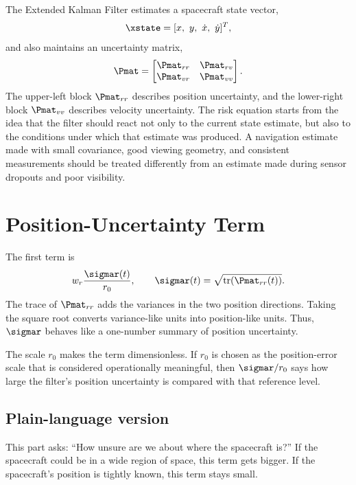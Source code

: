 \documentclass[11pt]{article}
\begin{document}
The Extended Kalman Filter estimates a spacecraft state vector,
\begin{equation}
  \xstate = [x,\ y,\ \dot{x},\ \dot{y}]^T,
\end{equation}
and also maintains an uncertainty matrix,
\begin{equation}
  \Pmat =
  \begin{bmatrix}
    \Pmat_{rr} & \Pmat_{rv}\\
    \Pmat_{vr} & \Pmat_{vv}
  \end{bmatrix}.
\end{equation}
The upper-left block $\Pmat_{rr}$ describes position uncertainty, and the
lower-right block $\Pmat_{vv}$ describes velocity uncertainty. The risk
equation starts from the idea that the filter should react not only to the
current state estimate, but also to the conditions under which that estimate
was produced. A navigation estimate made with small covariance, good viewing
geometry, and consistent measurements should be treated differently from an
estimate made during sensor dropouts and poor visibility.

\section{Position-Uncertainty Term}

The first term is
\begin{equation}
  w_r \frac{\sigmar(t)}{r_0},
  \qquad
  \sigmar(t)=\sqrt{\mathrm{tr}(\Pmat_{rr}(t))}.
\end{equation}
The trace of $\Pmat_{rr}$ adds the variances in the two position directions.
Taking the square root converts variance-like units into position-like units.
Thus, $\sigmar$ behaves like a one-number summary of position uncertainty.

The scale $r_0$ makes the term dimensionless. If $r_0$ is chosen as the
position-error scale that is considered operationally meaningful, then
$\sigmar/r_0$ says how large the filter's position uncertainty is compared with
that reference level.

\subsection*{Plain-language version}

This part asks: ``How unsure are we about where the spacecraft is?'' If the
spacecraft could be in a wide region of space, this term gets bigger. If the
spacecraft's position is tightly known, this term stays small.
\end{document}
